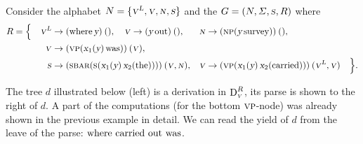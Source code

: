 \documentclass[../../document.tex]{subfiles}
\begin{document}
    \begin{example}
        Consider the alphabet \(N = \{\textsc{\textsl{v}}^{\textsc{\textsl{L}}}, \textsc{\textsl{v}}, \textsc{\textsl{n}}, \textsc{\textsl{s}} \}\) and the  \(G = (N, \varSigma, \textsc{\textsl{s}}, R)\) where
        \begin{align*}
            R = \Big\{ \quad
            \textsc{\textsl{v}}^{\textsc{\textsl{L}}} &\to (\text{where} \, \textsl{y})\:(),
            \quad \textsc{\textsl{v}} \to (\textsl{y} \, \text{out})\:(),
            &\textsc{\textsl{n}} &\to (\textsc{np} (\textsl{y} \, \text{survey}))\:(), \\
            \textsc{\textsl{v}} &\to (\textsc{vp}(\textsl{x}_1(\textsl{y}) \, \text{was}))\:(\textsc{\textsl{v}}),  \\
            \textsc{\textsl{s}} &\to (\textsc{sbar} (\textsc{s} (\textsl{x}_1(\textsl{y}) \, \textsl{x}_2(\text{the}))))\:(\textsc{\textsl{v}}, \textsc{\textsl{n}}),
            &\textsc{\textsl{v}} &\to (\textsc{vp}(\textsl{x}_1(\textsl{y}) \, \textsl{x}_2(\text{carried})))\:(\textsc{\textsl{v}}^{\textsc{\textsl{L}}}, \textsc{\textsl{v}})
            \quad \Big\} \text{.}
        \end{align*}

        The tree \(d\) illustrated below (left) is a derivation in \(\operatorname{D}^R_{\textsc{\textsl{v}}}\), its parse is shown to the right of \(d\).
        A part of the computations (for the bottom \(\textsc{vp}\)-node) was already shown in the previous example in detail.
        We can read the yield of \(d\) from the leave of the parse: \(\text{where carried out was}\).

        \null\hfill
        \hfill
        \hfill\null
    \end{example}
\end{document}
